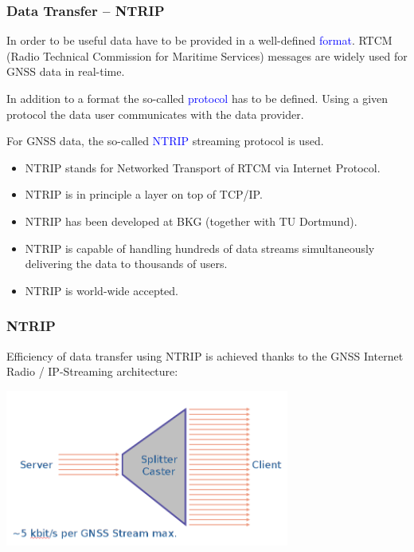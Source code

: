 \documentclass[10pt]{beamer}
\begin{document}
\begin{frame}
\frametitle{Data Transfer -- NTRIP}

In order to be useful data have to be provided in a well-defined \textcolor{blue}{format}.
RTCM (Radio Technical Commission for Maritime Services) messages are widely used for GNSS data in
real-time. 

\vspace*{5mm}

In addition to a format the so-called \textcolor{blue}{protocol} has to be defined. Using a given
protocol the data user communicates with the data provider.

For GNSS data, the so-called \textcolor{blue}{NTRIP} streaming protocol is used.
\begin{itemize}
\item NTRIP stands for Networked Transport of RTCM via Internet Protocol.
\item NTRIP is in principle a layer on top of TCP/IP.
\item NTRIP has been developed at BKG (together with TU Dortmund).
\item NTRIP is capable of handling hundreds of data streams simultaneously delivering the data
to thousands of users.
\item NTRIP is world-wide accepted.
\end{itemize}

\end{frame}


\begin{frame}
\frametitle{NTRIP}

Efficiency of data transfer using NTRIP is achieved thanks to the GNSS Internet Radio /
IP-Streaming architecture:

\begin{center}
\includegraphics[width=0.7\textwidth,angle=0]{ntrip.png}
\end{center}

\end{frame}
\end{document}
